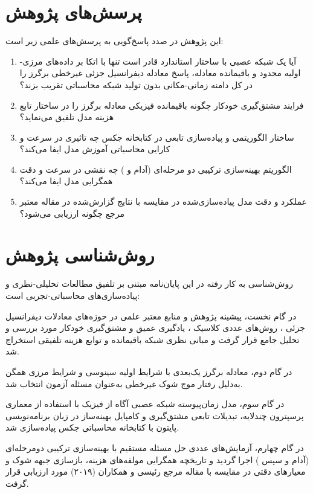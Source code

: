 \section{پرسش‌های پژوهش}
\label{sec:questions}

این پژوهش در صدد پاسخ‌گویی به پرسش‌های علمی زیر است:

\begin{enumerate}
\item آیا یک شبکه عصبی با ساختار استاندارد قادر است تنها با اتکا بر داده‌های مرزی-اولیه محدود و باقیمانده معادله، پاسخ معادله دیفرانسیل جزئی غیرخطی برگرز را در کل دامنه زمانی-مکانی بدون تولید شبکه محاسباتی تقریب بزند؟
\item فرایند مشتق‌گیری خودکار چگونه باقیمانده فیزیکی معادله برگرز را در ساختار تابع هزینه مدل تلفیق می‌نماید؟
\item ساختار الگوریتمی و پیاده‌سازی تابعی در کتابخانه جکس چه تاثیری در سرعت و کارایی محاسباتی آموزش مدل ایفا می‌کند؟
\item الگوریتم بهینه‌سازی ترکیبی دو مرحله‌ای (آدام و ) چه نقشی در سرعت و دقت همگرایی مدل ایفا می‌کند؟
\item عملکرد و دقت مدل پیاده‌سازی‌شده در مقایسه با نتایج گزارش‌شده در مقاله معتبر مرجع \cite{raissi2019} چگونه ارزیابی می‌شود؟
\end{enumerate}

\section{روش‌شناسی پژوهش}
\label{sec:methodology}

روش‌شناسی به کار رفته در این پایان‌نامه مبتنی بر تلفیق مطالعات تحلیلی-نظری و پیاده‌سازی‌های محاسباتی-تجربی است:

در گام نخست، پیشینه پژوهش و منابع معتبر علمی در حوزه‌های معادلات دیفرانسیل جزئی \cite{evans2010}، روش‌های عددی کلاسیک \cite{leveque2007,zienkiewicz2005}، یادگیری عمیق \cite{goodfellow2016} و مشتق‌گیری خودکار \cite{baydin2018} مورد بررسی و تحلیل جامع قرار گرفت و مبانی نظری شبکه باقیمانده و توابع هزینه تلفیقی استخراج شد.

در گام دوم، معادله برگرز یک‌بعدی با شرایط اولیه سینوسی و شرایط مرزی همگن به‌دلیل رفتار موج شوک غیرخطی به‌عنوان مسئله آزمون انتخاب شد.

در گام سوم، مدل زمان‌پیوسته شبکه عصبی آگاه از فیزیک با استفاده از معماری پرسپترون چندلایه، تبدیلات تابعی مشتق‌گیری و کامپایل بهینه‌ساز در زبان برنامه‌نویسی پایتون با کتابخانه محاسباتی جکس پیاده‌سازی شد.

در گام چهارم، آزمایش‌های عددی حل مسئله مستقیم با بهینه‌سازی ترکیبی دومرحله‌ای (آدام و سپس ) اجرا گردید و تاریخچه همگرایی مولفه‌های هزینه، بازسازی جبهه شوک و معیارهای دقتی در مقایسه با مقاله مرجع رئیسی و همکاران (۲۰۱۹) مورد ارزیابی قرار گرفت.

